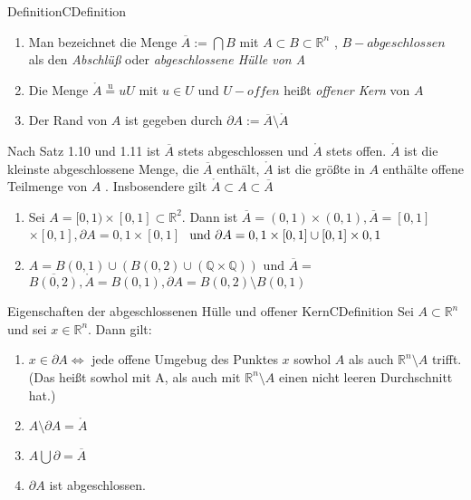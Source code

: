\documentclass[a4paper]{memoir}
\begin{document}
\begin{ibox}{Definition}{CDefinition}
    \begin{enumerate}[label=\alph*)]
        \item Man bezeichnet die Menge $ \overline{A}:= \bigcap B $ mit $ A \subset B \subset \mathbb{R}^n$ , $ B-abgeschlossen $ als den
            \textit{Abschlüß} oder \textit{abgeschlossene Hülle von A}
        \item Die Menge $ \mathring{A} \stackrel{\text{u}}{=} uU $ mit $ u \in U$ und $ U-offen $ heißt \textit{offener Kern} von $ A $
        \item Der Rand von $ A $ ist gegeben durch $ \partial A := \overline{A} \setminus \mathring{A} $ 
    \end{enumerate}
\end{ibox}

Nach Satz 1.10 und 1.11 ist $ \overline{A} $ stets abgeschlossen und $ \mathring{A} $ stets offen. $ \mathring{A} $ ist die kleinste
abgeschlossene Menge, die $ \overline{A} $ enthält, $ \mathring{A} $ ist die größte in $ A $ enthälte offene Teilmenge von $ A $ .
Insbosendere gilt $ \mathring{A} \subset A \subset \overline{A} $ 

\begin{enumerate}[label=\alph*)]
    \item Sei $ A = [0,1) \times [0,1] \subset \mathbb{R}^{2}$. Dann ist $ \overline{A} = (0,1) \times (0,1), \overline{A} = [0,1]$
       $ \times [0,1], \partial A = {0,1} \times [0,1]$
       $  \\ \text{ und } \partial A = {0,1} \times [0,1] \cup [0,1] \times {0,1}$  
    \item $ A = B(0,1) \cup \left( B(0,2) \cup \left( \mathbb{Q} \times \mathbb{Q} \right)  \right) \text{ und } \overline{A} =$
        $\overline{B(0,2)}, \mathring{A} = B(0,1), \partial A = B(0,2) \setminus B(0,1)$
\end{enumerate}
\begin{ibox}{Eigenschaften der abgeschlossenen Hülle und offener Kern}{CDefinition}
    \newline
    Sei $ A \subset \mathbb{R}^n $ und sei $ x \in \mathbb{R}^n $. Dann gilt:
    \begin{enumerate}[label=\alph*)]
        \item $ x \in \partial A \iff $ jede offene Umgebug des Punktes $ x $ sowhol $ A $ als auch $ \mathbb{R}^n \setminus A $ trifft.
            (Das heißt sowhol mit A, als auch mit $ \mathbb{R}^n \setminus A $ einen nicht leeren Durchschnitt hat.)
        \item $ A \setminus \partial A = \mathring{A}$
        \item $ A \bigcup \partial = \overline{A} $ 
        \item $ \partial A $ ist abgeschlossen.
    \end{enumerate}
\end{ibox}
\end{document}
